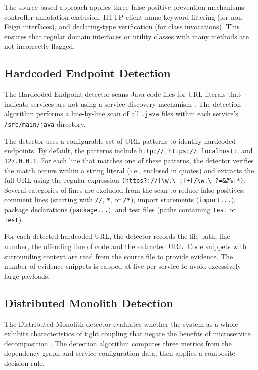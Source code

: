 The source-based approach applies three false-positive prevention mechanisms: controller annotation exclusion, HTTP-client name-keyword filtering (for non-Feign interfaces), and declaring-type verification (for class invocations). This ensures that regular domain interfaces or utility classes with many methods are not incorrectly flagged.

\subsection{Hardcoded Endpoint Detection}
\label{subsec:detect-hardcoded-endpoint}

\par The Hardcoded Endpoint detector scans Java code files for URL literals that indicate services are not using a service discovery mechanism \cite{Taibi2020}. The detection algorithm performs a line-by-line scan of all \texttt{.java} files within each service's \texttt{/src/main/java} directory.

The detector uses a configurable set of URL patterns to identify hardcoded endpoints. By default, the patterns include  \texttt{http://}, \texttt{https://}, \texttt{localhost:}, and \texttt{127.0.0.1}.
For each line that matches one of these patterns, the detector verifies the match occurs within a string literal (i.e., enclosed in quotes) and extracts the full URL using the regular expression \texttt{(https?://[\textbackslash w.\textbackslash-:]+[/\textbackslash w.\textbackslash-?=\&\#\%]*)}. Several categories of lines are excluded from the scan to reduce false positives: comment lines (starting with \texttt{//}, \texttt{*}, or \texttt{/*}), import statements (\texttt{import...}), package declarations (\texttt{package...}), and test files (paths containing \texttt{test} or \texttt{Test}).

For each detected hardcoded URL, the detector records the file path, line number, the offending line of code and the extracted URL. Code snippets with surrounding context are read from the source file to provide evidence. The number of evidence snippets is capped at five per service to avoid excessively large payloads.

\subsection{Distributed Monolith Detection}
\label{subsec:detect-distributed-monolith}

\par The Distributed Monolith detector evaluates whether the system as a whole exhibits characteristics of tight coupling that negate the benefits of microservice decomposition \cite{Newman2015, Richards2015}. The detection algorithm computes three metrics from the dependency graph and service configuration data, then applies a composite decision rule.

